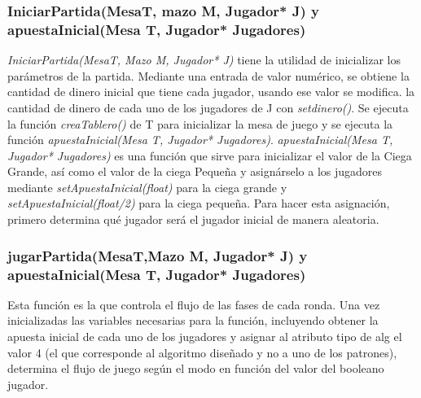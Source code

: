 \subsubsection{IniciarPartida(MesaT, mazo M, Jugador* J) y apuestaInicial(Mesa T, Jugador* Jugadores)}

\textit{IniciarPartida(MesaT, Mazo M, Jugador* J)} tiene la utilidad de inicializar los parámetros de la partida.
Mediante una entrada de valor numérico, se obtiene la cantidad de dinero inicial que tiene cada jugador, usando ese valor se modifica. la cantidad de dinero de cada uno de los jugadores de J con \textit{setdinero()}.
Se ejecuta la función\textit{ creaTablero()} de T para inicializar la mesa de juego y se ejecuta la función \textit{apuestaInicial(Mesa T, Jugador* Jugadores)}.
\textit{apuestaInicial(Mesa T, Jugador* Jugadores)} es una función que sirve para inicializar el valor de la Ciega Grande, así como el valor de la ciega Pequeña y asignárselo a los jugadores mediante \textit{setApuestaInicial(float)} para la ciega grande y \textit{setApuestaInicial(float/2)} para la ciega pequeña. Para hacer esta asignación, primero determina qué jugador será el jugador inicial de manera aleatoria.

\subsubsection{jugarPartida(MesaT,Mazo M, Jugador* J) y apuestaInicial(Mesa T, Jugador* Jugadores)}

Esta función es la que controla el flujo de las fases de cada ronda.
Una vez inicializadas las variables necesarias para la función, incluyendo obtener la apuesta inicial de cada uno de los jugadores y asignar al atributo tipo de alg el valor 4 (el que corresponde al algoritmo diseñado y no a uno de los patrones), determina el flujo de juego según el modo en función del valor del booleano jugador. 


